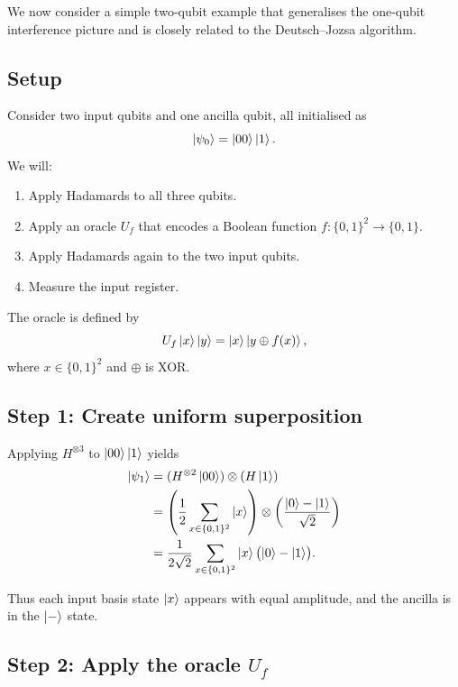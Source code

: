 \documentclass[a4paper,11pt]{article}
\providecommand{\ket}[1]{\mathinner{|{#1}\rangle}}
\begin{document}
We now consider a simple two-qubit example that generalises the one-qubit interference picture
and is closely related to the Deutsch--Jozsa algorithm.

\subsection*{Setup}

Consider two input qubits and one ancilla qubit, all initialised as
\begin{equation}
  \ket{\psi_0} = \ket{00}\ket{1}.
\end{equation}
We will:
\begin{enumerate}
  \item Apply Hadamards to all three qubits.
  \item Apply an oracle $U_f$ that encodes a Boolean function $f : \{0,1\}^2 \to \{0,1\}$.
  \item Apply Hadamards again to the two input qubits.
  \item Measure the input register.
\end{enumerate}

The oracle is defined by
\begin{equation}
  U_f\ket{x}\ket{y} = \ket{x}\ket{y \oplus f(x)},
\end{equation}
where $x \in \{0,1\}^2$ and $\oplus$ is XOR.

\subsection*{Step 1: Create uniform superposition}

Applying $H^{\otimes 3}$ to $\ket{00}\ket{1}$ yields
\begin{align}
  \ket{\psi_1} &= (H^{\otimes 2}\ket{00}) \otimes (H\ket{1}) \\
  &= \left(\frac{1}{2}\sum_{x \in \{0,1\}^2}\ket{x}\right)
     \otimes \left(\frac{\ket{0} - \ket{1}}{\sqrt{2}}\right) \\
  &= \frac{1}{2\sqrt{2}}\sum_{x \in \{0,1\}^2}\ket{x}\bigl(\ket{0} - \ket{1}\bigr).
\end{align}

Thus each input basis state $\ket{x}$ appears with equal amplitude, and the ancilla is in the
$\ket{-}$ state.

\subsection*{Step 2: Apply the oracle $U_f$}
\end{document}
